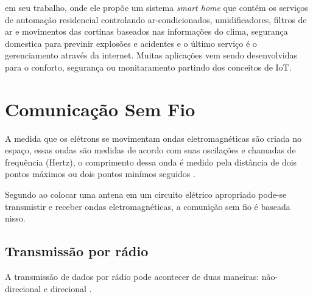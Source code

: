     \citeauthor{homesmart} em seu trabalho, onde ele propõe um sistema \textit{smart home} que contém os serviços de automação residencial controlando ar-condicionados, umidificadores, filtros de ar e movimentos das cortinas baseados nas informações do clima, segurança domestica para previnir explosões e acidentes e o último serviço é o gerenciamento através da internet. Muitas aplicações vem sendo desenvolvidas para o conforto, segurança ou monitaramento partindo dos conceitos de IoT.
    
\section{Comunicação Sem Fio}
    \par
    A medida que os elétrons se movimentam ondas eletromagnéticas são criada no espaço, essas ondas são medidas de acordo com suas oscilações e chamadas de frequência (Hertz), o comprimento dessa onda é medido pela distância de dois pontos máximos ou dois pontos minímos seguidos \cite{tenenbaum2002}.
    \par
    Segundo \citeauthor{tenenbaum2002} ao colocar uma antena em um circuito elétrico apropriado pode-se  transmistir e receber ondas 
    eletromagnéticas, a comunição sem fio é baseada nisso.
    
    \subsection{Transmissão por rádio}
        
        \par
        A transmissão de dados por rádio pode acontecer de duas maneiras: não-direcional e direcional  \cite{torres2001}.
        
